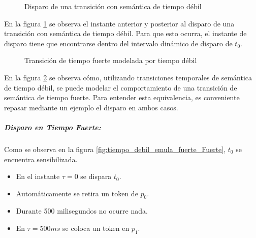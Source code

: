 \begin{figure}[h]
  \centering
  \caption{Disparo de una transición con semántica de tiempo débil}
  \label{fig:disparo_tiempo_debil}
\end{figure}

En la figura \ref{fig:disparo_tiempo_debil} se observa el instante anterior y
posterior al disparo de una transición con semántica de tiempo débil. Para que
esto ocurra, el instante de disparo tiene que encontrarse dentro del intervalo
dinámico de disparo de $t_{0}$.

\begin{figure}[h]
  \centering
  \hspace*{\fill}
  \subcapcentertrue
  \hspace*{\fill}
  \caption{Transición de tiempo fuerte modelada por tiempo débil}
  \label{fig:tiempo_debil_emula_fuerte}
\end{figure}

En la figura \ref{fig:tiempo_debil_emula_fuerte} se observa cómo, utilizando
transiciones temporales de semántica de tiempo débil, se puede modelar el
comportamiento de una transición de semántica de tiempo fuerte.
Para entender esta equivalencia, es conveniente repasar mediante un ejemplo el
disparo en ambos casos.

\subparagraph{Disparo en Tiempo Fuerte:}
Como se observa en la figura \ref{fig:tiempo_debil_emula_fuerte_Fuerte}, $t_{0}$ se
encuentra sensibilizada.
\begin{itemize}
  \item En el instante $\tau = 0$ se dispara $t_{0}$.
  \item Automáticamente se retira un token de $p_{0}$.
  \item Durante 500 milisegundos no ocurre nada.
  \item En $\tau = 500ms$ se coloca un token en $p_{1}$.
\end{itemize}

